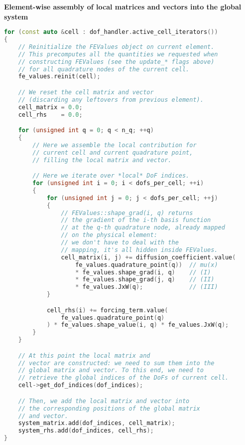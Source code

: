 \begin{flushleft}
    \textcolor{Green3}{ \textbf{Element-wise assembly of local matrices and vectors into the global system}}
\end{flushleft}
\begin{lstlisting}[language=C++]
for (const auto &cell : dof_handler.active_cell_iterators())
{
    // Reinitialize the FEValues object on current element.
    // This precomputes all the quantities we requested when
    // constructing FEValues (see the update_* flags above)
    // for all quadrature nodes of the current cell.
    fe_values.reinit(cell);

    // We reset the cell matrix and vector
    // (discarding any leftovers from previous element).
    cell_matrix = 0.0;
    cell_rhs    = 0.0;

    for (unsigned int q = 0; q < n_q; ++q)
    {
        // Here we assemble the local contribution for
        // current cell and current quadrature point,
        // filling the local matrix and vector.

        // Here we iterate over *local* DoF indices.
        for (unsigned int i = 0; i < dofs_per_cell; ++i)
        {
            for (unsigned int j = 0; j < dofs_per_cell; ++j)
            {
                // FEValues::shape_grad(i, q) returns
                // the gradient of the i-th basis function
                // at the q-th quadrature node, already mapped
                // on the physical element:
                // we don't have to deal with the
                // mapping, it's all hidden inside FEValues.
                cell_matrix(i, j) += diffusion_coefficient.value(
                    fe_values.quadrature_point(q))  // mu(x)
                    * fe_values.shape_grad(i, q)    // (I)
                    * fe_values.shape_grad(j, q)    // (II)
                    * fe_values.JxW(q);             // (III)
            }

            cell_rhs(i) += forcing_term.value(
                fe_values.quadrature_point(q)
            ) * fe_values.shape_value(i, q) * fe_values.JxW(q);
        }
    }

    // At this point the local matrix and
    // vector are constructed: we need to sum them into the
    // global matrix and vector. To this end, we need to
    // retrieve the global indices of the DoFs of current cell.
    cell->get_dof_indices(dof_indices);

    // Then, we add the local matrix and vector into
    // the corresponding positions of the global matrix
    // and vector.
    system_matrix.add(dof_indices, cell_matrix);
    system_rhs.add(dof_indices, cell_rhs);
}\end{lstlisting}
